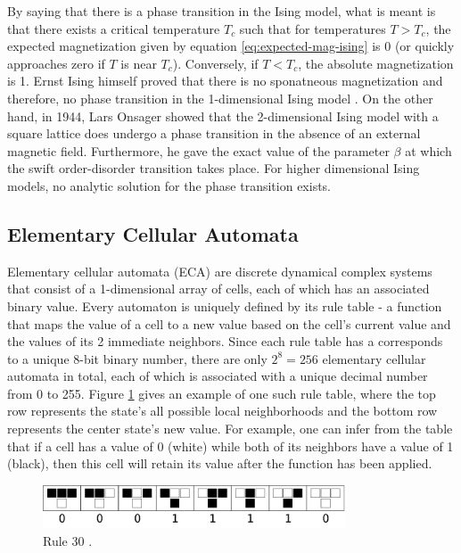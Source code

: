 \documentclass[12pt]{article}
\begin{document}
By saying that there is a phase transition in the Ising model, what is meant is that there exists a critical temperature $T_c$ such that for temperatures $T > T_c$, the expected magnetization given by equation \ref{eq:expected-mag-ising} is 0 (or quickly approaches zero if $T$ is near $T_c$). Conversely, if $T < T_c$, the absolute magnetization is 1. Ernst Ising himself proved that there is no sponatneous magnetization and therefore, no phase transition in the 1-dimensional Ising model \cite{Ising1925}. On the other hand, in 1944, Lars Onsager showed \cite{lars-onsanger} that the 2-dimensional Ising model with a square lattice does undergo a phase transition in the absence of an external magnetic field. Furthermore, he gave the exact value of the parameter $\beta$ at which the swift order-disorder transition takes place. For higher dimensional Ising models, no analytic solution for the phase transition exists. 

\subsection{Elementary Cellular Automata}

Elementary cellular automata (ECA) are discrete dynamical complex systems that consist of a 1-dimensional array of cells, each of which has an associated binary value. Every automaton is uniquely defined by its rule table - a function that maps the value of a cell to a new value based on the cell's current value and the values of its 2 immediate neighbors. Since each rule table has a corresponds to a unique 8-bit binary number, there are only $2^8 = 256$ elementary cellular automata in total, each of which is associated with a unique decimal number from 0 to 255. Figure \ref{fig:eca-rule-table} gives an example of one such rule table, where the top row represents the state's all possible local neighborhoods and the bottom row represents the center state's new value. For example, one can infer from the table that if a cell has a value of 0 (white) while both of its neighbors have a value of 1 (black), then this cell will retain its value after the function has been applied. 

\begin{figure} [!h]
\begin{center}
\includegraphics[width=0.8\textwidth]{eca-rule-example}
\caption{Rule 30 \cite{weisstein-eca}.}
\label{fig:eca-rule-table}
\end{center}
\end{figure}
\end{document}
